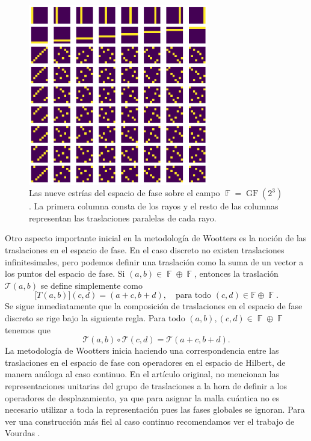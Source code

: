 \documentclass[a4paper]{report}
\DeclareMathOperator{\F}{\mathbb{F}}
\DeclareMathOperator{\GF}{GF}
\begin{document}
  \begin{figure}[ht]
    \centering
    \includegraphics[width=0.7\textwidth]{imgs/GF23.png}
    \caption{Las nueve estrías del espacio de fase sobre el
    campo $\F = \GF\left(2^3\right)$. La primera columna
    consta de los rayos y el resto de las columnas
    representan las traslaciones paralelas de cada rayo.}
    \label{fig:GF-2-3}
  \end{figure}
  Otro aspecto importante inicial en la metodología de
  Wootters es la noción de las traslaciones en el espacio de
  fase. En el caso discreto no existen traslaciones
  infinitesimales, pero podemos definir una traslación como
  la suma de un vector a los puntos del espacio de fase. Si
  $(a,b) \in \F \oplus \F$, entonces la traslación $\mathcal
  T(a,b)$ se define simplemente como
  \begin{equation}
    \mathcal [T(a,b)](c,d) = (a+c, b+d),
    \quad
    \text{para todo } (c,d) \in \mathbb F \oplus \F.
  \end{equation} 
  Se sigue inmediatamente que la composición de traslaciones
  en el espacio de fase discreto se rige bajo la siguiente
  regla. Para todo $(a,b), (c,d) \in \F \oplus \F$ tenemos
  que
  \begin{equation}
    \label{eqn:translation_composition}
    \mathcal T(a,b) \circ \mathcal T(c,d)
    = \mathcal T(a+c,b+d).
  \end{equation}
  La metodología de Wootters inicia haciendo una
  correspondencia entre las traslaciones en el espacio de
  fase con operadores en el espacio de Hilbert, de manera
  análoga al caso continuo. En el artículo original, no
  mencionan las representaciones unitarias del grupo de
  traslaciones a la hora de definir a los operadores de
  desplazamiento, ya que para asignar la malla cuántica no
  es necesario utilizar a toda la representación pues las
  fases globales se ignoran. Para ver una construcción más
  fiel al caso continuo recomendamos ver el trabajo de
  Vourdas \cite{vourdas2005}.
\end{document}
